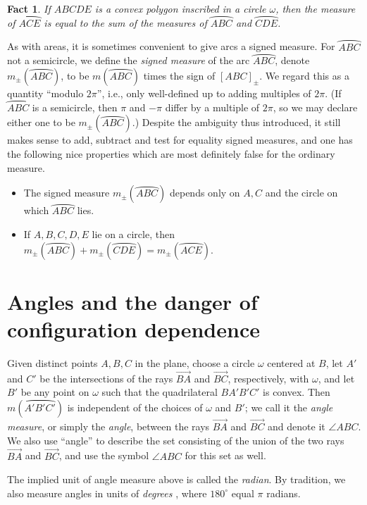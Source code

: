 \documentclass[12pt]{book}
\numberwithin{exc}{section}
\numberwithin{figure}{section}
\newtheorem{fact}[theorem]{Fact}
\numberwithin{equation}{theorem}
\def\ang{\angle}
\def\ray#1{\overrightarrow{#1}}
\def\arc#1{\wideparen{#1}}
\begin{document}
\begin{fact} \label{fact:arcsum}
If $ABCDE$ is a convex polygon inscribed in a circle $\omega$, then the measure
of $\arc{ACE}$ is equal to the sum of the measures of $\arc{ABC}$
and $\arc{CDE}$.
\end{fact}

As with areas, it is sometimes convenient to give arcs a signed measure.
For $\arc{ABC}$ not a semicircle,
we define the \emph{signed measure}  of the arc $\arc{ABC}$,
denote $m_{\pm}(\arc{ABC})$, to be $m(\arc{ABC})$ times the sign
of $[ABC]_{\pm}$. We regard this as a quantity ``modulo $2\pi$'', i.e.,
only well-defined up to adding multiples of $2\pi$. (If $\arc{ABC}$ is a
semicircle, then $\pi$ and $-\pi$ differ by a multiple of $2\pi$, so
we may declare either one to be $m_{\pm}(\arc{ABC})$.)
Despite the ambiguity thus introduced, it still makes sense to add,
subtract and test for equality signed measures, and one has the following
nice properties which are most definitely false for the ordinary measure.
\begin{itemize}
\item The signed measure $m_{\pm}(\arc{ABC})$ 
depends only on $A,C$ and the circle
on which $\arc{ABC}$ lies.
\item If $A,B,C,D,E$ lie on a circle, then 
$m_{\pm}(\arc{ABC})+m_{\pm}(\arc{CDE}) = m_{\pm}(\arc{ACE})$.
\end{itemize}

\section{Angles and the danger of configuration dependence}
\label{sec:angles}

Given distinct points $A,B,C$ in the plane, choose a circle $\omega$
centered at $B$, let $A'$ and $C'$ be the intersections of the rays
$\ray{BA}$ and $\ray{BC}$, respectively, with $\omega$, and let $B'$
be any point on $\omega$ such that the quadrilateral $BA'B'C'$ is convex.
Then $m(\arc{A'B'C'})$ is independent of the choices of $\omega$
and $B'$; we call it the
\emph{angle measure}, 
or simply the \emph{angle}, 
between the rays $\ray{BA}$ and $\ray{BC}$ and denote it 
$\ang ABC$. 
We also use ``angle'' to describe the set consisting of the union
of the two rays $\ray{BA}$ and $\ray{BC}$, and use the symbol $\ang ABC$ for
this set as well.

The implied unit of angle measure above is called the \emph{radian}.
By tradition, we also measure angles in units of
\emph{degrees} , where $180^\circ$
equal $\pi$ radians.
\end{document}
